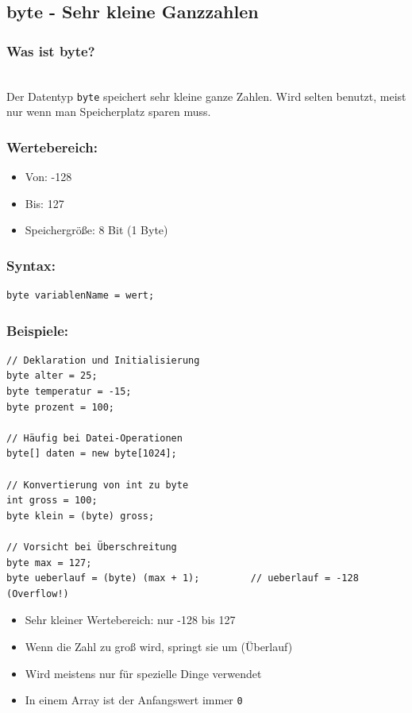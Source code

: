 \newpage


\subsection*{byte - Sehr kleine Ganzzahlen}

\subsubsection*{Was ist byte?}\\
Der Datentyp \texttt{byte} speichert sehr kleine ganze Zahlen.
Wird selten benutzt, meist nur wenn man Speicherplatz sparen muss.

\subsubsection*{Wertebereich:}
\begin{itemize}
	\item Von: -128
	\item Bis: 127
	\item Speichergröße: 8 Bit (1 Byte)
\end{itemize}

\subsubsection*{Syntax:}
\begin{lstlisting}
byte variablenName = wert;
\end{lstlisting}

\subsubsection*{Beispiele:}
\begin{lstlisting}
// Deklaration und Initialisierung
byte alter = 25;
byte temperatur = -15;
byte prozent = 100;

// Häufig bei Datei-Operationen
byte[] daten = new byte[1024];

// Konvertierung von int zu byte
int gross = 100;
byte klein = (byte) gross;

// Vorsicht bei Überschreitung
byte max = 127;
byte ueberlauf = (byte) (max + 1);         // ueberlauf = -128 (Overflow!)
\end{lstlisting}

\begin{achtung}
	\begin{itemize}
		\item Sehr kleiner Wertebereich: nur -128 bis 127
		\item Wenn die Zahl zu groß wird, springt sie um (Überlauf)
		\item Wird meistens nur für spezielle Dinge verwendet
		\item In einem Array ist der Anfangswert immer \texttt{0}
	\end{itemize}
\end{achtung}

